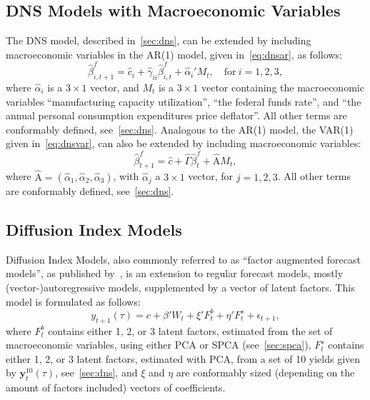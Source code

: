 \subsection{DNS Models with Macroeconomic Variables}
\label{sec:dnsmv}
The DNS model, described in~\cref{sec:dns}, can be extended by including macroeconomic variables in the AR(1) model, given in~\cref{eq:dnsar}, as follows:
\begin{equation}
	\hat{\beta}_{i,t+1}^{f} = \hat{c}_i + \hat{\gamma}_{ii} \hat{\beta}_{i,t}^f + \hat{\alpha}_i' M_t, \quad \text{for}~i = 1,2,3,
\end{equation}
where $\hat{\alpha}_i$ is a $3 \times 1$ vector, and $M_t$ is a $3 \times 1$ vector containing the macroeconomic variables \enquote{manufacturing capacity utilization}, \enquote{the federal funds rate}, and \enquote{the annual personal consumption expenditures price deflator}. 
All other terms are conformably defined, see~\cref{sec:dns}. 
Analogous to the AR(1) model, the VAR(1) given in~\cref{eq:dnsvar}, can also be extended by including macroeconomic variables:
\begin{equation}
	\hat{\beta}_{t+1}^{f} = \hat{c} + \hat{\Gamma} \hat{\beta}_t^f + \hat{\mathrm{A}} M_t,
\end{equation}
where $\hat{\mathrm{A}} = \left(\hat{\alpha}_1, \hat{\alpha}_2, \hat{\alpha}_3 \right)$, with $\hat{\alpha}_j$ a $3 \times 1$ vector, for $j = 1,2,3$. 
All other terms are conformably defined, see~\cref{sec:dns}.

\subsection{Diffusion Index Models}
\label{sec:dif}
Diffusion Index Models, also commonly referred to as \enquote{factor augmented forecast models}, as published by~\textcite[hereafter DIF]{Stock2002a,Stock2002b}, is an extension to regular forecast models, mostly (vector-)autoregressive models, supplemented by a vector of latent factors. 
This model is formulated as follows:
\begin{equation}
	y_{t+1}(\tau) = c + \beta' W_t + \xi' F_t^b + \eta' F_t^s + \epsilon_{t+1},
\end{equation}
where $F_t^b$ contains either 1, 2, or 3 latent factors, estimated from the set of macroeconomic variables, using either PCA or SPCA (see~\cref{sec:spca}), $F_t^s$ contains either 1, 2, or 3 latent factors, estimated with PCA, from a set of 10 yields given by $\mathbf{y}_t^{10}(\tau)$, see~\cref{sec:dns}, and $\xi$ and $\eta$ are conformably sized (depending on the amount of factors included) vectors of coefficients. 

